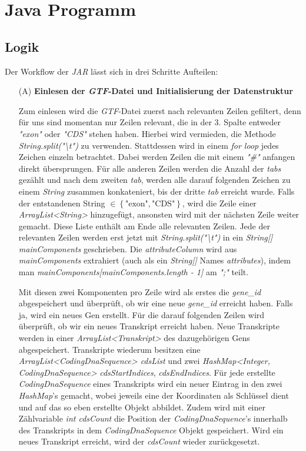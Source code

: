 \documentclass[12pt]{article}
\begin{document}
\section{Java Programm}
\subsection{Logik}\label{sec:logik}
Der Workflow der \textit{JAR} lässt sich in drei Schritte Aufteilen:
\begin{enumerate}
	\item[(A)] \textbf{Einlesen der \textit{GTF}-Datei und Initialisierung der Datenstruktur}

		Zum einlesen wird die \textit{GTF}-Datei zuerst nach relevanten Zeilen gefiltert, denn
		für uns sind momentan nur Zeilen relevant, die in der 3. Spalte entweder
		\textit{"exon"} oder \textit{"CDS"} stehen haben. Hierbei wird vermieden,
		die Methode \textit{String.split("\textbackslash t")} zu verwenden.
		Stattdessen wird in einem \textit{for loop} jedes Zeichen einzeln betrachtet.
		Dabei werden Zeilen die mit einem \textit{"\#"} anfangen direkt übersprungen.
		Für alle anderen Zeilen werden die Anzahl der \textit{tabs} gezählt und nach
		dem zweiten \textit{tab}, werden alle darauf folgenden Zeichen zu einem
		\textit{String} zusammen konkateniert, bis der dritte \textit{tab}
		erreicht wurde. Falls der entstandenen String $\in \left\{\text{"exon"}, \text{"CDS"} \right\}$, wird die
		Zeile einer \textit{ArrayList<String>} hinzugefügt, ansonsten wird mit der nächsten Zeile weiter gemacht.
		Diese Liste enthält am Ende alle relevanten Zeilen.
		Jede der relevanten Zeilen werden erst jetzt mit \textit{String.split("\textbackslash t")} in
		ein \textit{String[] mainComponents} geschrieben. Die \textit{attributeColumn} wird aus
		\textit{mainComponents} extrahiert (auch als ein \textit{String[]} Names \textit{attributes}),
		indem man \textit{mainComponents[mainComponents.length - 1]} am \textit{";"} teilt.

		Mit diesen zwei Komponenten pro Zeile wird als erstes die \textit{gene\_id} abgespeichert
		und überprüft, ob wir eine neue \textit{gene\_id} erreicht haben.
		Falls ja, wird ein neues Gen erstellt. Für die darauf folgenden Zeilen wird überprüft,
		ob wir ein neues Transkript erreicht haben. Neue Transkripte werden in einer
		\textit{ArrayList<Transkript>} des dazugehörigen Gens abgespeichert.
		Transkripte wiederum besitzen eine \textit{ArrayList<CodingDnaSequence> cdsList} und zwei
		\textit{HashMap<Integer, CodingDnaSequence>} \textit{cdsStartIndices}, \textit{cdsEndIndices}. 
        Für jede erstellte \textit{CodingDnaSequence} eines Transkripts wird ein neuer
        Eintrag in den zwei \textit{HashMap}'s gemacht, wobei jeweils eine der Koordinaten als
        Schlüssel dient und auf das so eben erstellte Objekt abbildet.
		Zudem wird mit einer Zählvariable \textit{int cdsCount} die Position der \textit{CodingDnaSequence}'s
		innerhalb des Transkripts in dem \textit{CodingDnaSequence} Objekt gespeichert. Wird ein neues Transkript
        erreicht, wird der \textit{cdsCount} wieder zurückgesetzt.


\end{enumerate}
\end{document}
